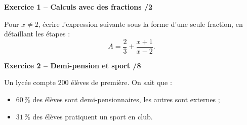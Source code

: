 \documentclass[10pt,a4paper]{article}
\begin{document}


\textbf{Exercice 1 -- Calculs avec des fractions \hfill /2}

Pour \(x\neq2\), écrire l'expression suivante sous la forme d'une seule fraction, en détaillant les étapes :
\[
A=\dfrac{2}{3}+\dfrac{x+1}{x-2}.
\]

\vspace{2.3cm}

\textbf{Exercice 2 -- Demi-pension et sport \hfill /8}

Un lycée compte \(200\) élèves de première. On sait que :
\begin{itemize}
\item \(60\,\%\) des élèves sont demi-pensionnaires, les autres sont externes ;
\item \(31\,\%\) des élèves pratiquent un sport en club.
\end{itemize}
\end{document}
